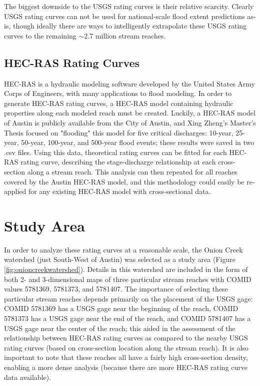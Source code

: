\documentclass[12pt]{article}
\begin{document}
The biggest downside to the USGS rating curves is their relative scarcity. Clearly USGS rating curves can not be used for national-scale flood extent predictions as-is, though ideally there are ways to intelligently extrapolate these USGS rating curves to the remaining $\sim$2.7 million stream reaches. 

\subsection*{HEC-RAS Rating Curves}

HEC-RAS is a hydraulic modeling software developed by the United States Army Corps of Engineers, with many applications to flood modeling. In order to generate HEC-RAS rating curves, a HEC-RAS model containing hydraulic properties along each modeled reach must be created. Luckily, a HEC-RAS model of Austin is publicly available from the City of Austin, and Xing Zheng's Master's Thesis focused on "flooding" this model for five critical discharges: 10-year, 25-year, 50-year, 100-year, and 500-year flood events; these results were saved in two .csv files. Using this data, theoretical rating curves can be fitted for each HEC-RAS rating curve, describing the stage-discharge relationship at each cross-section along a stream reach. This analysis can then repeated for all reaches covered by the Austin HEC-RAS model, and this methodology could easily be re-applied for any existing HEC-RAS model with cross-sectional data. 

\section*{Study Area}

In order to analyze these rating curves at a reasonable scale, the Onion Creek watershed (just South-West of Austin) was selected as a study area (Figure \ref{fig:onioncreekwatershed}). Details in this watershed are included in the form of both 2- and 3-dimensional maps of three particular stream reaches with COMID values 5781369, 5781373, and 5781407. The importance of selecting these particular stream reaches depends primarily on the placement of the USGS gage: COMID 5781369 has a USGS gage near the beginning of the reach, COMID 5781373 has a USGS gage near the end of the reach, and COMID 5781407 has a USGS gage near the center of the reach; this aided in the assessment of the relationship between HEC-RAS rating curves as compared to the nearby USGS rating curves (based on cross-section location along the stream reach). It is also important to note that these reaches all have a fairly high cross-section density, enabling a more dense analysis (because there are more HEC-RAS rating curve data available). 
\end{document}
